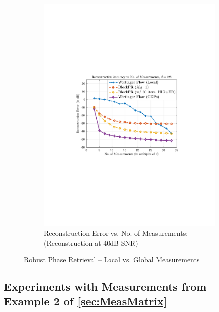\begin{figure}[hbtp]
\begin{subfigure}[b]{0.8\textwidth}
\centering
\includegraphics[trim = 1.5in 3.5in 1.5in 3.25in,scale=0.8]{pics/fig2b}
\caption{Reconstruction Error vs. No. of Measurements; (Reconstruction at $40$dB SNR)}
\label{fig:WF_meas}
\end{subfigure}
\caption{Robust Phase Retrieval -- Local vs. Global Measurements}
\label{fig:WF}
\end{figure}
%


\subsection{Experiments with Measurements from Example 2 of \cref{sec:MeasMatrix}}
\label{sec:SparseMeasureMasks}

